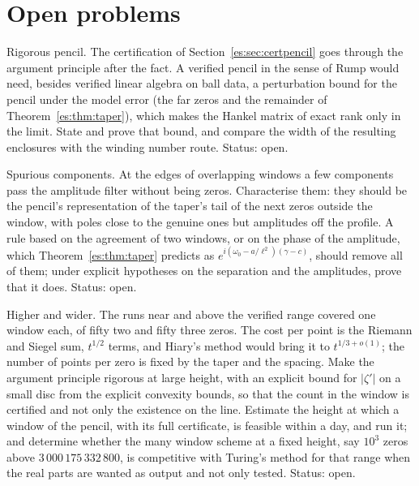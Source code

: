 \section{Open problems}\label{es:sec:open}

\begin{problem}\label{es:prob:rigorous_pencil}
Rigorous pencil. The certification of Section~\ref{es:sec:certpencil} goes through the argument principle after the fact. A verified pencil in the sense of Rump would need, besides verified linear algebra on ball data, a perturbation bound for the pencil under the model error (the far zeros and the remainder of Theorem~\ref{es:thm:taper}), which makes the Hankel matrix of exact rank only in the limit. State and prove that bound, and compare the width of the resulting enclosures with the winding number route. Status: open.
\end{problem}

\begin{problem}\label{es:prob:spurious}
Spurious components. At the edges of overlapping windows a few components pass the amplitude filter without being zeros. Characterise them: they should be the pencil's representation of the taper's tail of the next zeros outside the window, with poles close to the genuine ones but amplitudes off the profile. A rule based on the agreement of two windows, or on the phase of the amplitude, which Theorem~\ref{es:thm:taper} predicts as $e^{i(\omega_0-a/\ell^2)(\gamma-c)}$, should remove all of them; under explicit hypotheses on the separation and the amplitudes, prove that it does. Status: open.
\end{problem}

\begin{problem}\label{es:prob:higher_wider}
Higher and wider. The runs near and above the verified range covered one window each, of fifty two and fifty three zeros. The cost per point is the Riemann and Siegel sum, $t^{1/2}$ terms, and Hiary's method \cite{Hiary11} would bring it to $t^{1/3+o(1)}$; the number of points per zero is fixed by the taper and the spacing. Make the argument principle rigorous at large height, with an explicit bound for $|\zeta'|$ on a small disc from the explicit convexity bounds, so that the count in the window is certified and not only the existence on the line. Estimate the height at which a window of the pencil, with its full certificate, is feasible within a day, and run it; and determine whether the many window scheme at a fixed height, say $10^{3}$ zeros above $3\,000\,175\,332\,800$, is competitive with Turing's method for that range when the real parts are wanted as output and not only tested. Status: open.
\end{problem}

